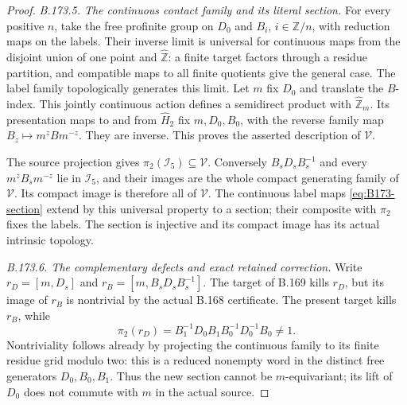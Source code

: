 \begin{proof}
\emph{B.173.5. The continuous contact family and its literal section.}
For every positive \(n\), take the free profinite group on
\(D_0\) and \(B_i\), \(i\in\mathbb Z/n\), with reduction maps on
the labels. Their inverse limit is universal for continuous maps from
the disjoint union of one point and \(\widehat{\mathbb Z}\):
a finite target factors through a residue partition, and compatible
maps to all finite quotients give the general case.
The label family topologically generates this limit.
Let \(m\) fix \(D_0\) and translate the \(B\)-index.
This jointly continuous action defines a semidirect product with
\(\widehat{\mathbb Z}_m\). Its presentation maps to and from
\(\widehat H_2\) fix \(m,D_0,B_0\), with the reverse family map
\(B_z\mapsto m^zBm^{-z}\). They are inverse.
This proves the asserted description of \(\mathcal V\).

The source projection gives \(\pi_2(\mathcal I_5)\subseteq\mathcal V\).
Conversely \(B_sD_sB_s^{-1}\) and every
\(m^zB_sm^{-z}\) lie in \(\mathcal I_5\), and their images are the
whole compact generating family of \(\mathcal V\). Its compact image
is therefore all of \(\mathcal V\).
The continuous label maps \eqref{eq:B173-section} extend by this
universal property to a section; their composite with \(\pi_2\)
fixes the labels. The section is injective and its compact image has
its actual intrinsic topology.

\emph{B.173.6. The complementary defects and exact retained correction.}
Write \(r_D=[m,D_s]\) and \(r_B=[m,B_sD_sB_s^{-1}]\).
The target of B.169 kills \(r_D\), but its image of \(r_B\) is
nontrivial by the actual B.168 certificate.
The present target kills \(r_B\), while
\[
 \pi_2(r_D)=B_1^{-1}D_0B_1B_0^{-1}D_0^{-1}B_0\ne1.
 \tag{B.173.4}
\]
Nontriviality follows already by projecting the continuous family to
its finite residue grid modulo two: this is a reduced nonempty word
in the distinct free generators \(D_0,B_0,B_1\).
Thus the new section cannot be \(m\)-equivariant; its lift of \(D_0\)
does not commute with \(m\) in the actual source.


\end{proof}
